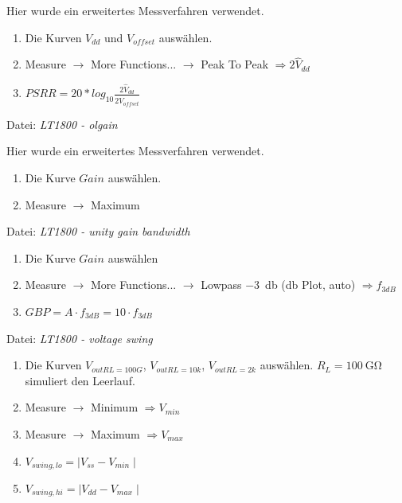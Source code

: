 \documentclass[
	ngerman,
	parskip=half,
	twocolumn,
	DIV=calc,
	]{scrartcl}
\begin{document}
	Hier wurde ein erweitertes Messverfahren \cite{website:amp_psrr_cmrr_circuits} verwendet.
	\begin{enumerate}
		\item Die Kurven $V_{dd}$ und $V_{offset}$ auswählen.
		\item Measure $\rightarrow$ More Functions... $\rightarrow$ Peak To Peak $\Rightarrow 2\hat{V}_{dd}$
		\item $ PSRR = 20 * log_{10} \frac{2\hat{V}_{dd}}{2\hat{V}_{offset}}$
	\end{enumerate}
	
	Datei: \emph{LT1800 - olgain}
	
	Hier wurde ein erweitertes Messverfahren \cite{website:amp_psrr_cmrr_circuits} verwendet.
	\begin{enumerate}
		\item Die Kurve $Gain$ auswählen.
		\item Measure $\rightarrow$ Maximum
	\end{enumerate}
	
	
	Datei: \emph{LT1800 - unity gain bandwidth}
	\begin{enumerate}
		\item Die Kurve $Gain$ auswählen
		\item Measure $\rightarrow$ More Functions... $\rightarrow$ Lowpass \SI{-3}{\decibel} (db Plot, auto) $\Rightarrow f_{3dB}$
		\item $ GBP = A \cdot f_{3dB} = 10 \cdot f_{3dB} $
	\end{enumerate}
	
	Datei: \emph{LT1800 - voltage swing}
	\begin{enumerate}
		\item Die Kurven $V_{out RL=100G}$, $V_{out RL=10k}$, $V_{out RL=2k}$ auswählen. $R_L=\SI{100}{\giga\ohm}$ simuliert den Leerlauf.
		\item Measure $\rightarrow$ Minimum $\Rightarrow V_{min}$
		\item Measure $\rightarrow$ Maximum $\Rightarrow V_{max}$
		\item $V_{swing, lo} = \mid V_{ss} - V_{min} \mid$
		\item $V_{swing, hi} = \mid V_{dd} - V_{max} \mid$
	\end{enumerate}

	
	
\end{document}
